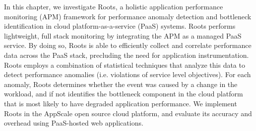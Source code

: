 In this chapter, we investigate Roots, a holistic 
application performance monitoring (APM) framework for 
performance anomaly detection and bottleneck identification 
in cloud platform-as-a-service (PaaS) systems.
Roots performs lightweight, full stack monitoring by integrating
the APM as a managed PaaS service.  By doing so, Roots is able to 
efficiently collect and correlate performance data across the PaaS stack,
precluding the need for application instrumentation.  Roots employs
a combination of statistical techniques that analyze this data to detect performance
anomalies (i.e. violations of service level objectives). For each anomaly, 
Roots determines whether the event was caused by a change in 
the workload, and if not identifies the bottleneck component in the cloud platform
that is most likely to have degraded application performance. 
We implement Roots in the AppScale open source cloud platform, and evaluate its 
accuracy and overhead using PaaS-hosted web applications.

